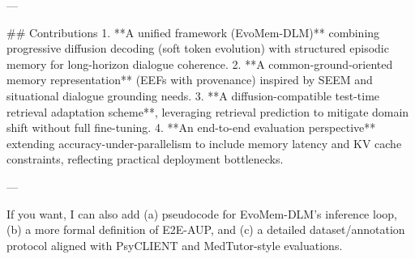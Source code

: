 ---

## Contributions  
1. **A unified framework (EvoMem-DLM)** combining progressive diffusion decoding (soft token evolution) with structured episodic memory for long-horizon dialogue coherence.  
2. **A common-ground-oriented memory representation** (EEFs with provenance) inspired by SEEM and situational dialogue grounding needs.  
3. **A diffusion-compatible test-time retrieval adaptation scheme**, leveraging retrieval prediction to mitigate domain shift without full fine-tuning.  
4. **An end-to-end evaluation perspective** extending accuracy-under-parallelism to include memory latency and KV cache constraints, reflecting practical deployment bottlenecks.  

--- 

If you want, I can also add (a) pseudocode for EvoMem-DLM’s inference loop, (b) a more formal definition of E2E-AUP, and (c) a detailed dataset/annotation protocol aligned with PsyCLIENT and MedTutor-style evaluations.